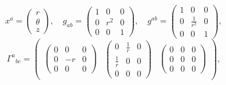 \documentclass[11pt]{article}
\begin{document}
    $$x^{a}=\begin{pmatrix}r\\\theta\\z\end{pmatrix},\quad g_{ab}=\begin{pmatrix} 1 & 0 & 0\\ 0 & r^{2} & 0\\ 0 & 0 & 1 \end{pmatrix},\quad g^{ab}=\begin{pmatrix} 1 & 0 & 0\\ 0 & \frac{1}{r^{2}} & 0\\ 0 & 0 & 1 \end{pmatrix},$$
$${\Gamma^{a}}_{bc}=\begin{pmatrix} \begin{pmatrix} 0 & 0 & 0\\ 0 & - r & 0\\ 0 & 0 & 0 \end{pmatrix} & \begin{pmatrix} 0 & \frac{1}{r} & 0\\ \frac{1}{r} & 0 & 0\\ 0 & 0 & 0 \end{pmatrix} & \begin{pmatrix} 0 & 0 & 0\\ 0 & 0 & 0\\ 0 & 0 & 0 \end{pmatrix} \end{pmatrix},$$
\end{document}
